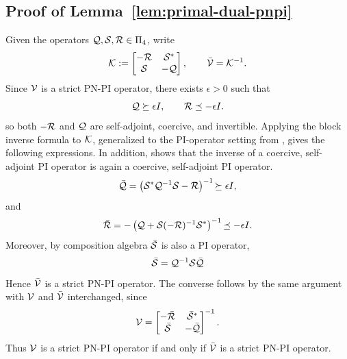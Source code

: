 \subsection{Proof of Lemma~\ref{lem:primal-dual-pnpi}}\label{proof:primal-dual-pnpi}
Given the operators $\mathcal{Q}, \mathcal{S}, \mathcal{R} \in \Pi_4$, write
\begin{equation*}
\mathcal{K}:=\begin{bmatrix}-\mathcal{R} & \mathcal{S}^* \\ \mathcal{S} & -\mathcal{Q}\end{bmatrix},
\qquad
\bar{\mathcal{V}}=\mathcal{K}^{-1}.
\end{equation*}
Since \(\mathcal{V}\) is a strict PN-PI operator, there exists \(\epsilon>0\) such
that
\begin{equation*}
\mathcal{Q}\succeq \epsilon I,
\qquad
\mathcal{R}\preceq -\epsilon I.
\end{equation*}
so both \(-\mathcal{R}\) and \(\mathcal{Q}\) are self-adjoint, coercive, and invertible.
Applying the block inverse formula to \(\mathcal{K}\), generalized to the PI-operator
setting from \cite{lu2002inverses}, gives the following expressions. In
addition, \cite[Theorem 2]{peet2018convexsolutionhinftyoptimalcontroller} shows
that the inverse of a coercive, self-adjoint PI operator is again a coercive,
self-adjoint PI operator.
\begin{equation*}
\bar{\mathcal{Q}}
=
\left(\mathcal{S}^*\mathcal{Q}^{-1}\mathcal{S} -\mathcal{R}\right)^{-1}
{\succeq \epsilon I},
\end{equation*}
and
\begin{equation*}
\bar{\mathcal{R}}
=
-\left(\mathcal{Q}+\mathcal{S}(-\mathcal{R})^{-1}\mathcal{S}^*\right)^{-1}
{\preceq -\epsilon I}.
\end{equation*}
Moreover, by composition algebra $\bar{\mathcal{S}}$ is also a PI operator,
\begin{equation*}
\bar{\mathcal{S}} = {\mathcal{Q}}^{-1} \mathcal{S}\bar{\mathcal{Q}}
\end{equation*}
Hence \(\bar{\mathcal{V}}\) is a strict PN-PI operator. The converse follows by the
same argument with \(\mathcal{V}\) and \(\bar{\mathcal{V}}\) interchanged, since
\begin{equation*}
\mathcal{V}=\begin{bmatrix}-\bar{\mathcal{R}} & \bar{\mathcal{S}}^* \\ \bar{\mathcal{S}} & -\bar{\mathcal{Q}}\end{bmatrix}^{-1}.
\end{equation*}
Thus \(\mathcal{V}\) is a strict PN-PI operator if and only if \(\bar{\mathcal{V}}\) is a
strict PN-PI operator.

